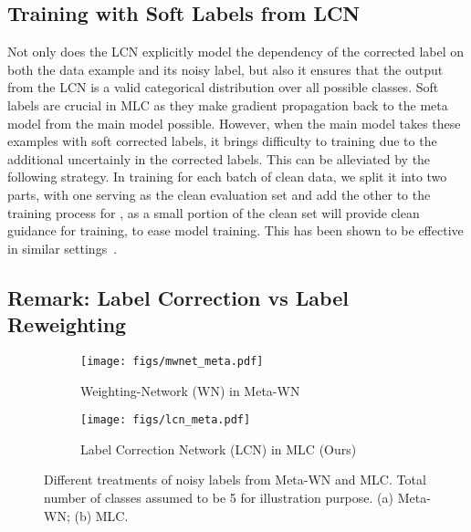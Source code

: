 \subsection{Training with Soft Labels from LCN}

Not only does the LCN explicitly model the dependency of the corrected
label on both the data example and its noisy label, but also it
ensures that the output from the LCN is a valid categorical
distribution over all possible classes. Soft labels are crucial in MLC
as they make gradient propagation back to the meta model from the main
model possible. However, when the main model takes these examples with
soft corrected labels, it brings difficulty to training due to the
additional uncertainly in the corrected labels. This can be alleviated
by the following strategy. In training for each batch of clean data,
we split it into two parts, with one serving as the clean evaluation
set and add the other to the training process for , as a small
portion of the clean set will provide clean guidance for training, to
ease model training. This has been shown to be effective in similar
settings~\cite{ranzato2015sequence, pham2020meta}. 

\subsection{Remark: Label Correction vs Label Reweighting}

\begin{figure}[t]
  \centering
  \begin{subfigure}{0.495\linewidth}
    \centering
    \texttt{[image: figs/mwnet\_meta.pdf]}
    \caption{Weighting-Network (WN) in Meta-WN~\cite{shu2019meta}}
  \end{subfigure}
  \hfill
  \begin{subfigure}{0.495\linewidth}
    \centering
    \texttt{[image: figs/lcn\_meta.pdf]}
    \caption{Label Correction Network (LCN) in MLC (Ours)}
  \end{subfigure}
  \caption{Different treatments of noisy labels from Meta-WN and
    MLC. Total number of classes assumed to be 5 for illustration
    purpose. (a) Meta-WN; (b) MLC.}
  \label{meta_ops}
  \vspace{-0.15in}
\end{figure}


